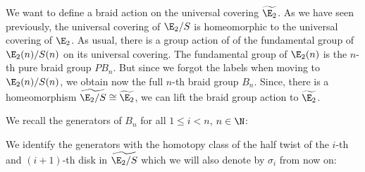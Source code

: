 \begin{const}
We want to define a braid action on the universal covering $\widetilde{\E_2}$.
As we have seen previously, the universal covering of $\E_2 \slash S$ is homeomorphic to the
universal covering of $\E_2$.
As usual, there is a group action of of the fundamental group of
$\E_2(n) \slash S(n)$ on its universal covering. The fundamental group of $\E_2(n)$ is the
$n$-th pure braid group $PB_n$. But since we forgot the labels when moving to $\E_2(n) \slash S(n)$, 
we obtain now the full $n$-th braid group $B_n$. Since, there is a homeomorphism 
$\widetilde{\E_2 \slash S} \cong \widetilde{\E_2}$, we can lift the braid group action 
to $\widetilde{\E_2}$.

We recall the generators of $B_n$ for all $1 \leq i < n$, $n \in \N$:
\begin{center}
\end{center}

We identify the generators with the homotopy class of the half twist of the $i$-th and $(i+1)$-th disk in
$\widetilde{\E_2 \slash S}$ which we will also denote by $\sigma_i$ from now on:
\begin{center}
\end{center}


\end{const}
